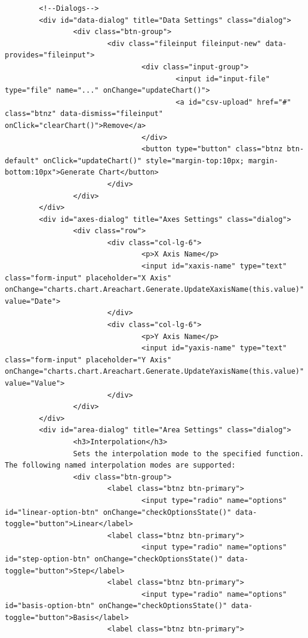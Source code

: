 \begin{lstlisting}
        <!--Dialogs-->
        <div id="data-dialog" title="Data Settings" class="dialog">
                <div class="btn-group">
                        <div class="fileinput fileinput-new" data-provides="fileinput">
                                <div class="input-group">
                                        <input id="input-file" type="file" name="..." onChange="updateChart()">
                                        <a id="csv-upload" href="#" class="btnz" data-dismiss="fileinput" onClick="clearChart()">Remove</a> 
                                </div>
                                <button type="button" class="btnz btn-default" onClick="updateChart()" style="margin-top:10px; margin-bottom:10px">Generate Chart</button>
                        </div>
                </div>
        </div>
        <div id="axes-dialog" title="Axes Settings" class="dialog">
                <div class="row">
                        <div class="col-lg-6">
                                <p>X Axis Name</p>
                                <input id="xaxis-name" type="text" class="form-input" placeholder="X Axis" onChange="charts.chart.Areachart.Generate.UpdateXaxisName(this.value)" value="Date">
                        </div>
                        <div class="col-lg-6">
                                <p>Y Axis Name</p>
                                <input id="yaxis-name" type="text" class="form-input" placeholder="Y Axis" onChange="charts.chart.Areachart.Generate.UpdateYaxisName(this.value)" value="Value">
                        </div>
                </div>
        </div>
        <div id="area-dialog" title="Area Settings" class="dialog">
                <h3>Interpolation</h3>
                Sets the interpolation mode to the specified function. The following named interpolation modes are supported:
                <div class="btn-group">
                        <label class="btnz btn-primary">
                                <input type="radio" name="options" id="linear-option-btn" onChange="checkOptionsState()" data-toggle="button">Linear</label>
                        <label class="btnz btn-primary">
                                <input type="radio" name="options" id="step-option-btn" onChange="checkOptionsState()" data-toggle="button">Step</label>
                        <label class="btnz btn-primary">
                                <input type="radio" name="options" id="basis-option-btn" onChange="checkOptionsState()" data-toggle="button">Basis</label>
                        <label class="btnz btn-primary">

\end{lstlisting}
